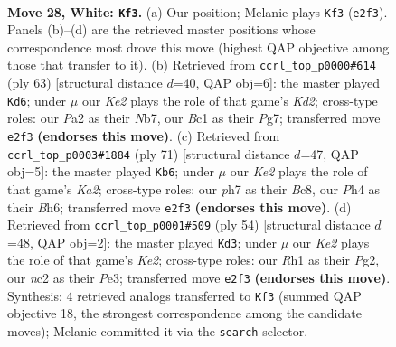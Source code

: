 \documentclass[11pt]{article}
\begin{document}
\clearpage

\begin{figure}[p]\centering
\begin{subfigure}{0.46\textwidth}\centering
\resizebox{\linewidth}{!}{%
\newchessgame
\chessboard[
  setfen={4k3/Nppnp1rp/6p1/p7/5P1P/2P5/P1n1KP2/2B4R w - - 1 28},
  showmover=false,
  pgfstyle=straightmove, color=movearrow, markmove={e2-f3}
]}
\caption{}
\end{subfigure}\hfill
\begin{subfigure}{0.46\textwidth}\centering
\resizebox{\linewidth}{!}{%
\newchessgame
\chessboard[
  setfen={1r6/1n1k2p1/1N2pp2/p6p/7P/P7/1PR2PP1/5K2 b - - 3 32},
  showmover=false,
  pgfstyle=straightmove, color=movearrow, markmove={d7-d6}
]}
\caption{}
\end{subfigure}
\\[4pt]
\begin{subfigure}{0.46\textwidth}\centering
\resizebox{\linewidth}{!}{%
\newchessgame
\chessboard[
  setfen={2br4/k4p2/p6b/1p1p1p1P/8/P6R/NPP3P1/1K1B4 b - - 0 36},
  showmover=false,
  pgfstyle=straightmove, color=movearrow, markmove={a7-b6}
]}
\caption{}
\end{subfigure}\hfill
\begin{subfigure}{0.46\textwidth}\centering
\resizebox{\linewidth}{!}{%
\newchessgame
\chessboard[
  setfen={5k2/5ppp/1pr1p3/1p6/8/PP2P3/1R2KPPP/8 w - - 0 28},
  showmover=false,
  pgfstyle=straightmove, color=movearrow, markmove={e2-d3}
]}
\caption{}
\end{subfigure}
\caption{\textbf{Move 28, White: \texttt{Kf3}.} (a) Our position; Melanie plays \texttt{Kf3} (\texttt{e2f3}). Panels (b)--(d) are the retrieved master positions whose correspondence most drove this move (highest QAP objective among those that transfer to it). (b) Retrieved from \texttt{ccrl\_top\_p0000\#614} (ply 63) [structural distance $d$=40, QAP obj=6]: the master played \texttt{Kd6}; under $\mu$ our \emph{Ke2} plays the role of that game's \emph{Kd2}; cross-type roles: our \emph{P}a2 as their \emph{N}b7, our \emph{B}c1 as their \emph{P}g7; transferred move \texttt{e2f3} \textbf{(endorses this move)}. (c) Retrieved from \texttt{ccrl\_top\_p0003\#1884} (ply 71) [structural distance $d$=47, QAP obj=5]: the master played \texttt{Kb6}; under $\mu$ our \emph{Ke2} plays the role of that game's \emph{Ka2}; cross-type roles: our \emph{p}h7 as their \emph{B}c8, our \emph{P}h4 as their \emph{B}h6; transferred move \texttt{e2f3} \textbf{(endorses this move)}. (d) Retrieved from \texttt{ccrl\_top\_p0001\#509} (ply 54) [structural distance $d$=48, QAP obj=2]: the master played \texttt{Kd3}; under $\mu$ our \emph{Ke2} plays the role of that game's \emph{Ke2}; cross-type roles: our \emph{R}h1 as their \emph{P}g2, our \emph{n}c2 as their \emph{P}e3; transferred move \texttt{e2f3} \textbf{(endorses this move)}. Synthesis: 4 retrieved analogs transferred to \texttt{Kf3} (summed QAP objective 18, the strongest correspondence among the candidate moves); Melanie committed it via the \texttt{search} selector.}
\label{fig:thought-m54}
\end{figure}
\end{document}
